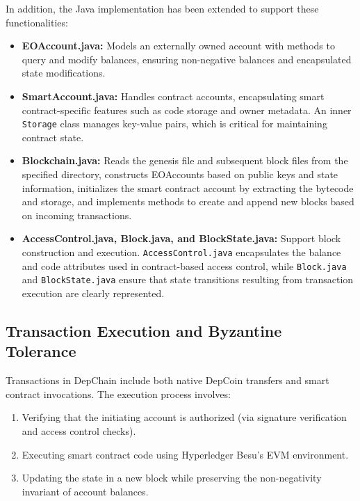 \documentclass[runningheads]{llncs}
\begin{document}
In addition, the Java implementation has been extended to support these functionalities:
\begin{itemize}
    \item \textbf{EOAccount.java:} Models an externally owned account with methods to query and modify balances, ensuring non-negative balances and encapsulated state modifications.
    \item \textbf{SmartAccount.java:} Handles contract accounts, encapsulating smart contract-specific features such as code storage and owner metadata. An inner \texttt{Storage} class manages key-value pairs, which is critical for maintaining contract state.
    \item \textbf{Blockchain.java:} Reads the genesis file and subsequent block files from the specified directory, constructs EOAccounts based on public keys and state information, initializes the smart contract account by extracting the bytecode and storage, and implements methods to create and append new blocks based on incoming transactions.
    \item \textbf{AccessControl.java, Block.java, and BlockState.java:} Support block construction and execution. \texttt{AccessControl.java} encapsulates the balance and code attributes used in contract-based access control, while \texttt{Block.java} and \texttt{BlockState.java} ensure that state transitions resulting from transaction execution are clearly represented.
\end{itemize}

\subsection{Transaction Execution and Byzantine Tolerance}
Transactions in DepChain include both native DepCoin transfers and smart contract invocations. The execution process involves:
\begin{enumerate}
    \item Verifying that the initiating account is authorized (via signature verification and access control checks).
    \item Executing smart contract code using Hyperledger Besu's EVM environment.
    \item Updating the state in a new block while preserving the non-negativity invariant of account balances.
\end{enumerate}
\end{document}
